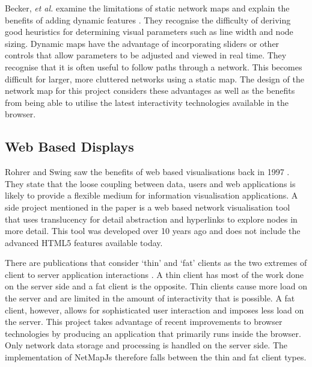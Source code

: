 \documentclass[11pt, a4paper]{report}
\begin{document}
Becker, \emph{et al.} examine the limitations of static network maps and explain
the benefits of adding dynamic features \cite{Becker_1990}. They recognise the
difficulty of deriving good heuristics for determining visual parameters such as
line width and node sizing. Dynamic maps have the advantage of incorporating
sliders or other controls that allow parameters to be adjusted and viewed in
real time. They recognise that it is often useful to follow paths through a
network. This becomes difficult for larger, more cluttered networks using
a static map. The design of the network map for this project considers these
advantages as well as the benefits from being able to utilise the latest
interactivity technologies available in the browser.



\subsection{Web Based Displays}
\label{sec:web-based-displays}

Rohrer and Swing saw the benefits of web based visualisations back in 1997
\cite{Rohrer_1997}. They state that the loose coupling between data, users and
web applications is likely to provide a flexible medium for information
visualisation applications.  A side project mentioned in the paper is a web
based network visualisation tool that uses translucency for detail abstraction
and hyperlinks to explore nodes in more detail. This tool was developed over 10
years ago and does not include the advanced HTML5 features available today.

  
There are publications that consider `thin' and `fat' clients as the two
extremes of client to server application interactions
\cite{Eick_2007}\cite{Jern_1998}. A thin client has most of the work done on the
server side and a fat client is the opposite. Thin clients cause more load on
the server and are limited in the amount of interactivity that is possible. A
fat client, however, allows for sophisticated user interaction and imposes less
load on the server. This project takes advantage of recent improvements to
browser technologies by producing an application that primarily runs inside the
browser. Only network data storage and processing is handled on the server side.
The implementation of NetMapJs therefore falls between the thin and fat client
types.
\end{document}
